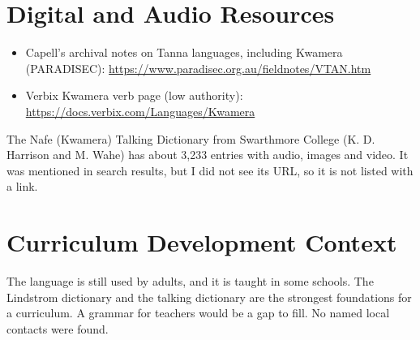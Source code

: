 \documentclass[12pt]{article}
\begin{document}
\section{Digital and Audio Resources}
\begin{itemize}
\item Capell's archival notes on Tanna languages, including Kwamera (PARADISEC): \url{https://www.paradisec.org.au/fieldnotes/VTAN.htm}
\item Verbix Kwamera verb page (low authority): \url{https://docs.verbix.com/Languages/Kwamera}
\end{itemize}
The Nafe (Kwamera) Talking Dictionary from Swarthmore College (K. D. Harrison and M. Wahe) has about 3,233 entries with audio, images and video. It was mentioned in search results, but I did not see its URL, so it is not listed with a link.

\section{Curriculum Development Context}
The language is still used by adults, and it is taught in some schools. The Lindstrom dictionary and the talking dictionary are the strongest foundations for a curriculum. A grammar for teachers would be a gap to fill. No named local contacts were found.
\end{document}
